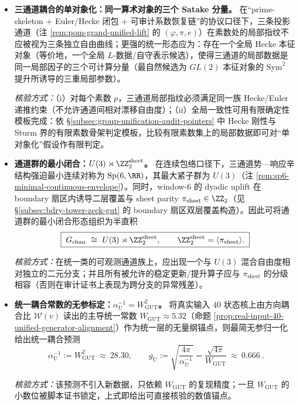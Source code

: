 \begin{itemize}
  \item \textbf{三通道耦合的单对象化：同一算术对象的三个 Satake 分量。}
  在“prime-skeleton + Euler/Hecke 闭包 + 可审计系数恢复链”的协议口径下，三条投影通道（注 \ref{rem:pom-grand-unified-lift} 的 \((\varphi,\pi,e)\)）在素数处的局部指纹不应被视为三条独立自由曲线；更强的统一形态应为：存在一个全局 Hecke 本征对象（等价地，一个全局 \(L\)-数据/自守表示候选），使得三通道的局部数据是同一局部因子的三个可计算分量（最自然候选为 \(GL(2)\) 本征对象的 \(\mathrm{Sym}^2\) 提升所诱导的三重局部参数）。
  \par\noindent\emph{核验方式：}（i）对每个素数 \(p\)，三通道局部指纹必须满足同一族 Hecke/Euler 递推约束（不允许通道间相对漂移自由度）；（ii）全局一致性可用有限确定性模板完成：依 \S\ref{subsec:group-unification-audit-pointers} 中 Hecke 刚性与 Sturm 界的有限素数骨架判定模板，比较有限素数集上的局部数据即可对“单对象化”假设作有限判定。

  \item \textbf{通道群的最小闭合：\(U(3)\rtimes \ZZ_2^{\mathrm{sheet}}\)。}
  在连续包络口径下，三通道势—响应辛结构强迫最小连续对称为 \(\mathrm{Sp}(6,\RR)\)，其最大紧子群为 \(U(3)\)（注 \ref{rem:sp6-minimal-continuous-envelope}）。同时，window-6 的 dyadic uplift 在 boundary 扇区内诱导二层覆盖与 sheet parity \(\pi_{\mathrm{sheet}}\in\ZZ_2\)（见 \S\ref{subsec:bdry-tower-zeck-gut} 的 boundary 扇区双层覆盖构造）。因此可将通道群的最小闭合形态组织为半直积
  \[
  \boxed{\;
  G_{\mathrm{chan}}\ \cong\ U(3)\rtimes \ZZ_2^{\mathrm{sheet}},
  \qquad \ZZ_2^{\mathrm{sheet}}=\langle \pi_{\mathrm{sheet}}\rangle.
  \;}
  \]
  \par\noindent\emph{核验方式：}在统一类的可观测通道族上，应出现一个与 \(U(3)\) 混合自由度相对独立的二元分支；并且所有被允许的稳定更新/提升算子应与 \(\pi_{\mathrm{sheet}}\) 的分级相容（否则在审计证书上表现为跨分支的异常残差）。

  \item \textbf{统一耦合常数的无参标定：\(\alpha_{\mathrm{U}}^{-1}=W_{\mathrm{GUT}}^2\)。}
  将真实输入 \(40\) 状态核上由方向耦合比 \(\mathcal{W}(v)\) 读出的主导统一常数 \(W_{\mathrm{GUT}}\approx 5.32\)（命题 \ref{prop:real-input-40-unified-generator-alignment}）作为统一层的无量纲锚点，则最简无参归一化给出统一耦合预测
  \[
  \boxed{\ \alpha_{\mathrm{U}}^{-1}:=W_{\mathrm{GUT}}^2\ \approx\ 28.30,\qquad
  g_{\mathrm{U}}:=\sqrt{\frac{4\pi}{\alpha_{\mathrm{U}}^{-1}}}=\frac{\sqrt{4\pi}}{W_{\mathrm{GUT}}}\ \approx\ 0.666\ }.
  \]
  \par\noindent\emph{核验方式：}该预测不引入新数据，只依赖 \(W_{\mathrm{GUT}}\) 的复现精度；一旦 \(W_{\mathrm{GUT}}\) 的小数位被脚本证书锁定，上式即给出可直接核验的数值锚点。


\end{itemize}

